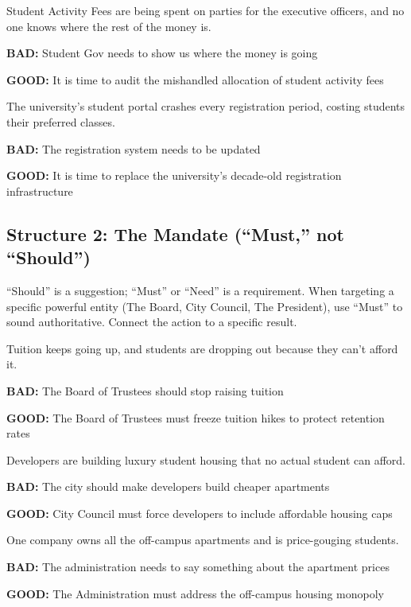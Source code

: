 \documentclass[12pt]{article}
\newcommand{\bad}[1]{\textbf{\textcolor{rose}{BAD:}} #1}
\newcommand{\good}[1]{\textbf{\textcolor{congaree}{GOOD:}} #1}
\newcommand{\context}[1]{#1}
\begin{document}
\begin{exampleblock}
\context{Student Activity Fees are being spent on parties for the executive officers, and no one knows where the rest of the money is.}

\bad{Student Gov needs to show us where the money is going}

\good{It is time to audit the mishandled allocation of student activity fees}
\end{exampleblock}

\begin{exampleblock}
\context{The university's student portal crashes every registration period, costing students their preferred classes.}

\bad{The registration system needs to be updated}

\good{It is time to replace the university's decade-old registration infrastructure}
\end{exampleblock}

\newpage
\subsection{Structure 2: The Mandate (``Must,'' not ``Should'')}
``Should'' is a suggestion; ``Must'' or ``Need'' is a requirement. When targeting a specific powerful entity (The Board, City Council, The President), use ``Must'' to sound authoritative. Connect the action to a specific result.

\begin{exampleblock}
\context{Tuition keeps going up, and students are dropping out because they can't afford it.}

\bad{The Board of Trustees should stop raising tuition}

\good{The Board of Trustees must freeze tuition hikes to protect retention rates}
\end{exampleblock}

\begin{exampleblock}
\context{Developers are building luxury student housing that no actual student can afford.}

\bad{The city should make developers build cheaper apartments}

\good{City Council must force developers to include affordable housing caps}
\end{exampleblock}

\begin{exampleblock}
\context{One company owns all the off-campus apartments and is price-gouging students.}

\bad{The administration needs to say something about the apartment prices}

\good{The Administration must address the off-campus housing monopoly}
\end{exampleblock}
\end{document}
